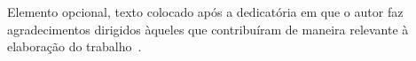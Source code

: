 \documentclass[
    12pt,				       %
    openright,			       %
    oneside,			       %
    a4paper,			       %
    chapter=TITLE,             %
    sumario=tradicional,       %
    english,			        %
    brazil, 				    %
 ]{abntex2}
\begin{document}
\frenchspacing


\pretextual


\imprimircapa

\imprimirfolhaderosto

\imprimirfolhadeaprovacao

\begin{dedicatoria}
    \vspace*{{\fill}}

    \begin{flushright}
        \begin{minipage}{0.5\textwidth} %
        \end{minipage}
    \end{flushright}

    \vspace*{2cm}
\end{dedicatoria}

\begin{agradecimentos}
    Elemento opcional, texto colocado ap\'os a dedicat\'oria em que o autor faz agradecimentos dirigidos àqueles que contribuíram de maneira relevante à elaboração do trabalho~\cite{NBR14724:2011}.
\end{agradecimentos}

\begin{epigrafe}
    \vspace*{\fill}

    \begin{flushright}
        \begin{minipage}{0.5\textwidth} %
        \end{minipage}
    \end{flushright}

    \vspace*{2cm}
\end{epigrafe}
\end{document}
